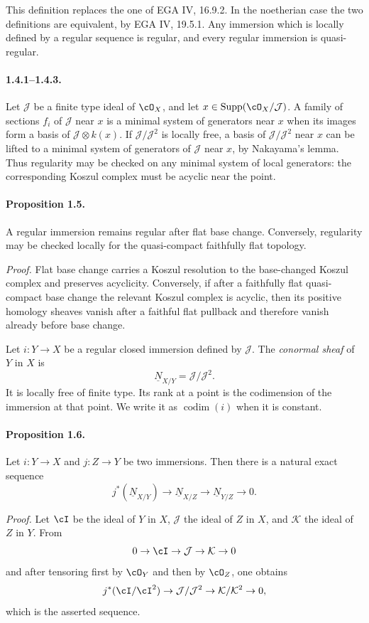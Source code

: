 \documentclass[11pt]{article}
\theoremstyle{plain}
\theoremstyle{definition}
\theoremstyle{remark}
\newcommand{\cJ}{\mathcal J}\newcommand{\cK}{\mathcal K}\newcommand{\cL}{\mathcal L}
\DeclareMathOperator{\Supp}{Supp}
\DeclareMathOperator{\codim}{codim}
\providecommand{\codim}{\operatorname{codim}}
\begin{document}
This definition replaces the one of EGA IV, 16.9.2. In the noetherian case the two definitions are equivalent, by EGA IV, 19.5.1. Any immersion which is locally defined by a regular sequence is regular, and every regular immersion is quasi-regular.

\paragraph{1.4.1--1.4.3.} Let $\cJ$ be a finite type ideal of $\cO_X$, and let $x\in\Supp(\cO_X/\cJ)$. A family of sections $f_i$ of $\cJ$ near $x$ is a minimal system of generators near $x$ when its images form a basis of $\cJ\otimes k(x)$. If $\cJ/\cJ^2$ is locally free, a basis of $\cJ/\cJ^2$ near $x$ can be lifted to a minimal system of generators of $\cJ$ near $x$, by Nakayama's lemma. Thus regularity may be checked on any minimal system of local generators: the corresponding Koszul complex must be acyclic near the point.

\paragraph{Proposition 1.5.} A regular immersion remains regular after flat base change. Conversely, regularity may be checked locally for the quasi-compact faithfully flat topology.

\emph{Proof.} Flat base change carries a Koszul resolution to the base-changed Koszul complex and preserves acyclicity. Conversely, if after a faithfully flat quasi-compact base change the relevant Koszul complex is acyclic, then its positive homology sheaves vanish after a faithful flat pullback and therefore vanish already before base change.

Let $i:Y\to X$ be a regular closed immersion defined by $\cJ$. The \emph{conormal sheaf} of $Y$ in $X$ is
\[
\underline N_{X/Y}=\cJ/\cJ^2.
\]
It is locally free of finite type. Its rank at a point is the codimension of the immersion at that point. We write it as $\codim(i)$ when it is constant.

\paragraph{Proposition 1.6.} Let $i:Y\to X$ and $j:Z\to Y$ be two immersions. Then there is a natural exact sequence
\[
j^*(\underline N_{X/Y})\longrightarrow \underline N_{X/Z}\longrightarrow \underline N_{Y/Z}\longrightarrow0.
\]

\emph{Proof.} Let $\cI$ be the ideal of $Y$ in $X$, $\cJ$ the ideal of $Z$ in $X$, and $\cK$ the ideal of $Z$ in $Y$. From
\[
0\to\cI\to\cJ\to\cK\to0
\]
and after tensoring first by $\cO_Y$ and then by $\cO_Z$, one obtains
\[
j^*(\cI/\cI^2)\to\cJ/\cJ^2\to\cK/\cK^2\to0,
\]
which is the asserted sequence.
\end{document}
